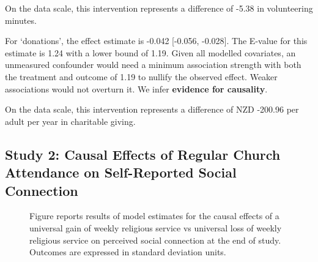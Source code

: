 \documentclass[
  singlecolumn]{article}
\begin{document}
On the data scale, this intervention represents a difference of -5.38 in
volunteering minutes.

For `donations', the effect estimate is -0.042 {[}-0.056, -0.028{]}. The
E-value for this estimate is 1.24 with a lower bound of 1.19. Given all
modelled covariates, an unmeasured confounder would need a minimum
association strength with both the treatment and outcome of 1.19 to
nullify the observed effect. Weaker associations would not overturn it.
We infer \textbf{evidence for causality}.

On the data scale, this intervention represents a difference of NZD
-200.96 per adult per year in charitable giving.

\newpage{}

\subsection{Study 2: Causal Effects of Regular Church Attendance on
Self-Reported Social
Connection}\label{study-2-causal-effects-of-regular-church-attendance-on-self-reported-social-connection}

\begin{figure}


\caption{\label{fig-2_1}Figure reports results of model estimates for
the causal effects of a universal gain of weekly religious service vs
universal loss of weekly religious service on perceived social
connection at the end of study. Outcomes are expressed in standard
deviation units.}

\end{figure}%
\end{document}
